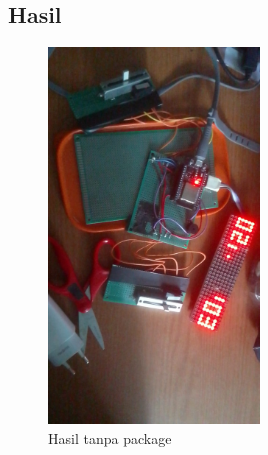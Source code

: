 \documentclass[a4paper,12pt]{article}
\begin{document}
\subsection{Hasil}
\begin{figure}[h!]
    \centering
    \includegraphics[width=0.5\textwidth]{./images/no-package.jpeg}
    \caption{Hasil tanpa package}
\end{figure}
\end{document}
